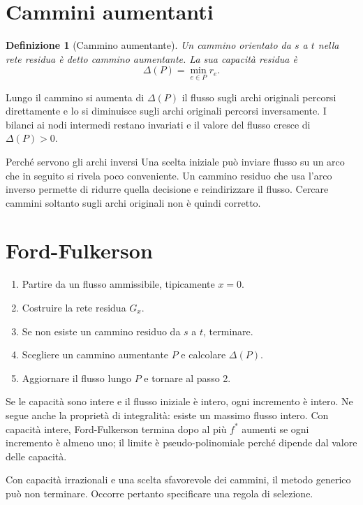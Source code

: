 \documentclass[11pt,a4paper]{article}
\newtheorem{definition}{Definizione}[section]
\begin{document}
\section{Cammini aumentanti}

\begin{definition}[Cammino aumentante]
Un cammino orientato da $s$ a $t$ nella rete residua è detto \emph{cammino aumentante}. La sua capacità residua è
\[
\Delta(P)=\min_{e\in P}r_e.
\]
\end{definition}

Lungo il cammino si aumenta di $\Delta(P)$ il flusso sugli archi originali percorsi direttamente e lo si diminuisce sugli archi originali percorsi inversamente. I bilanci ai nodi intermedi restano invariati e il valore del flusso cresce di $\Delta(P)>0$.

\begin{examplebox}{Perché servono gli archi inversi}
Una scelta iniziale può inviare flusso su un arco che in seguito si rivela poco conveniente. Un cammino residuo che usa l'arco inverso permette di ridurre quella decisione e reindirizzare il flusso. Cercare cammini soltanto sugli archi originali non è quindi corretto.
\end{examplebox}

\section{Ford-Fulkerson}

\begin{enumerate}
\item Partire da un flusso ammissibile, tipicamente $x=0$.
\item Costruire la rete residua $G_x$.
\item Se non esiste un cammino residuo da $s$ a $t$, terminare.
\item Scegliere un cammino aumentante $P$ e calcolare $\Delta(P)$.
\item Aggiornare il flusso lungo $P$ e tornare al passo 2.
\end{enumerate}

Se le capacità sono intere e il flusso iniziale è intero, ogni incremento è intero. Ne segue anche la proprietà di integralità: esiste un massimo flusso intero. Con capacità intere, Ford-Fulkerson termina dopo al più $f^*$ aumenti se ogni incremento è almeno uno; il limite è pseudo-polinomiale perché dipende dal valore delle capacità.

Con capacità irrazionali e una scelta sfavorevole dei cammini, il metodo generico può non terminare. Occorre pertanto specificare una regola di selezione.
\end{document}

